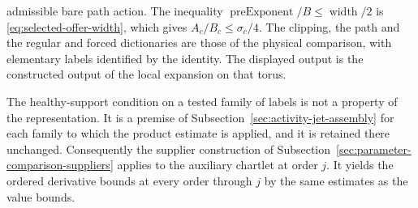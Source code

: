 \begin{lemma}
\begin{enumerate}
  admissible bare path action. The inequality
  $\operatorname{preExponent}/B\le\operatorname{width}/2$ is
  \eqref{eq:selected-offer-width}, which gives
  $A_c/B_c\le\sigma_c/4$. The clipping, the path and the regular and
  forced dictionaries are those of the physical comparison, with
  elementary labels identified by the identity. The displayed output is
  the constructed output of the local expansion on that torus.
\end{enumerate}
The healthy-support condition on a tested family of labels is not a
property of the representation. It is a premise of
Subsection~\ref{sec:activity-jet-assembly} for each family to which the
product estimate is applied, and it is retained there unchanged.
Consequently the supplier construction of
Subsection~\ref{sec:parameter-comparison-suppliers} applies to the
auxiliary chartlet at order $j$. It yields the ordered derivative
bounds at every order through $j$ by the same estimates as the value
bounds.
\end{lemma}

